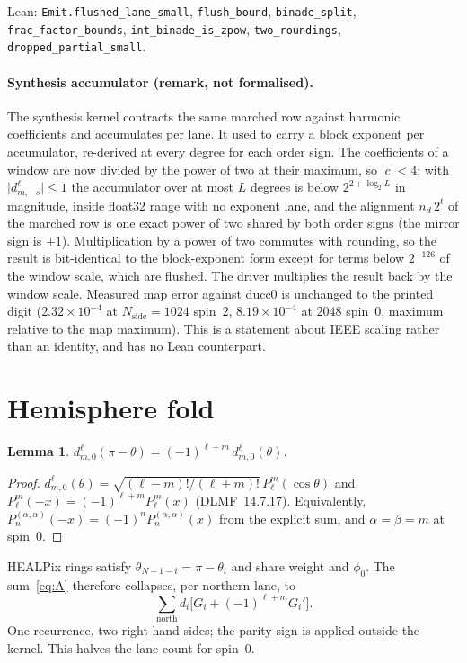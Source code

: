 \documentclass[11pt,a4paper]{article}
\newtheorem{lemma}[theorem]{Lemma}
\numberwithin{equation}{section}
\begin{document}
Lean: \texttt{Emit.flushed\_lane\_small}, \texttt{flush\_bound},
\texttt{binade\_split}, \texttt{frac\_factor\_bounds},
\texttt{int\_binade\_is\_zpow}, \texttt{two\_roundings},
\texttt{dropped\_partial\_small}.

\paragraph{Synthesis accumulator (remark, not formalised).}
The synthesis kernel contracts the same marched row against harmonic
coefficients and accumulates per lane.  It used to carry a block exponent
per accumulator, re-derived at every degree for each order sign.  The
coefficients of a window are now divided by the power of two at their
maximum, so $\lvert c\rvert<4$; with $\lvert d^\ell_{m,-s}\rvert\le 1$ the
accumulator over at most $L$ degrees is below $2^{2+\log_2 L}$ in magnitude,
inside float32 range with no exponent lane, and the alignment
$n_d\,2^{t}$ of the marched row is one exact power of two shared by both
order signs (the mirror sign is $\pm 1$).  Multiplication by a power of two
commutes with rounding, so the result is bit-identical to the
block-exponent form except for terms below $2^{-126}$ of the window scale,
which are flushed.  The driver multiplies the result back by the window
scale.  Measured map error against ducc0 is unchanged to the printed digit
($2.32\times 10^{-4}$ at $N_{\mathrm{side}}=1024$ spin~$2$,
$8.19\times 10^{-4}$ at $2048$ spin~$0$, maximum relative to the map
maximum).  This is a statement about IEEE scaling rather than an identity,
and has no Lean counterpart.

\section{Hemisphere fold}
\label{sec:fold}

\begin{lemma}
\label{lem:fold}
$d^\ell_{m,0}(\pi-\theta)=(-1)^{\ell+m}\, d^\ell_{m,0}(\theta)$.
\end{lemma}

\begin{proof}
$d^\ell_{m,0}(\theta)=\sqrt{(\ell-m)!/(\ell+m)!}\,P_\ell^m(\cos\theta)$ and
$P_\ell^m(-x)=(-1)^{\ell+m}P_\ell^m(x)$ (DLMF~14.7.17).  Equivalently,
$P_n^{(\alpha,\alpha)}(-x)=(-1)^n P_n^{(\alpha,\alpha)}(x)$ from the
explicit sum, and $\alpha=\beta=m$ at spin~$0$.
\end{proof}

HEALPix rings satisfy $\theta_{N-1-i}=\pi-\theta_i$ and share weight and
$\phi_0$.  The sum~\eqref{eq:A} therefore collapses, per northern lane, to
\begin{equation}
\label{eq:fold}
\sum_{\mathrm{north}} d_i\bigl[G_i+(-1)^{\ell+m}G_i'\bigr].
\end{equation}
One recurrence, two right-hand sides; the parity sign is applied outside
the kernel.  This halves the lane count for spin~$0$.
\end{document}
